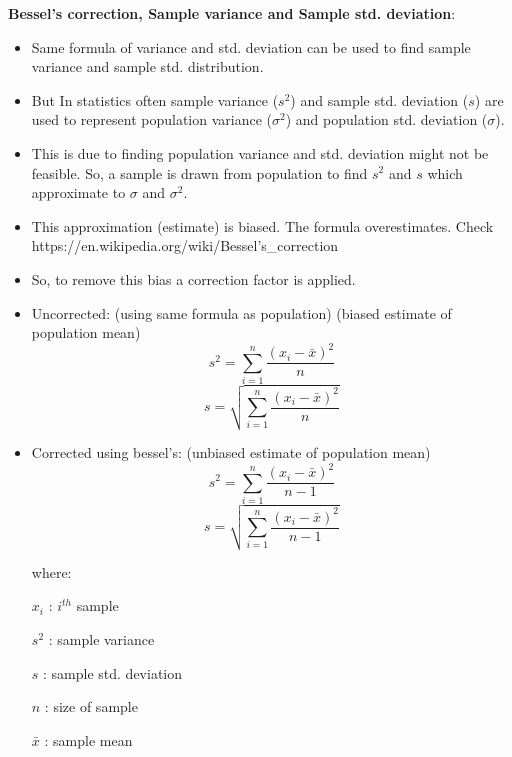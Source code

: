\documentclass[	DIV=calc,%
paper=a4,%
fontsize=11pt,%
twocolumn]{scrartcl} %
\newcommand{\formdesc}[1]{\noindent\textbf{#1}}
\begin{document}
\formdesc{Bessel's correction, Sample variance and Sample std. deviation}:
\begin{itemize}
	\item Same formula of variance and std. deviation can be used to find sample variance and sample std. distribution.
	\item But In statistics often sample variance ($s^2$) and sample std. deviation  ($s$) are used to represent population variance ($\sigma^2$) and population std. deviation ($\sigma$).
	\item This is due to finding population variance and std. deviation might not be feasible. So, a sample is drawn from population to find $s^2$ and   $s$  which approximate to $\sigma$ and $\sigma^2$.
	\item This approximation (estimate) is biased. The formula overestimates. Check https://en.wikipedia.org/wiki/Bessel's\_correction
	\item So, to remove this bias a correction factor is applied.
	\item Uncorrected: (using same formula as population) (biased estimate of population mean)
	\begin{equation}
				s^2 = \sum_{i=1}^{n}\frac{(x_i-\bar{x})^2}{n}
			\end{equation}
		\begin{equation}
			s = \sqrt{\sum_{i=1}^{n}\dfrac{(x_i-\bar{x})^2}{n}}
		\end{equation}
	
	\item Corrected using bessel's: (unbiased estimate of population mean)
	\begin{equation}
		s^2 = \sum_{i=1}^{n}\frac{(x_i-\bar{x})^2}{n-1}
	\end{equation}
	\begin{equation}
		s = \sqrt{\sum_{i=1}^{n}\dfrac{(x_i-\bar{x})^2}{n-1}}
	\end{equation}
	
	where:
	
	$x_i$ : $i^{th}$ sample
	
	$s^2$ : sample variance
	
	$s$ : sample std. deviation
	
	$n$ : size of sample
	
	$\bar{x}$ : sample mean
	

\end{itemize}
\end{document}
